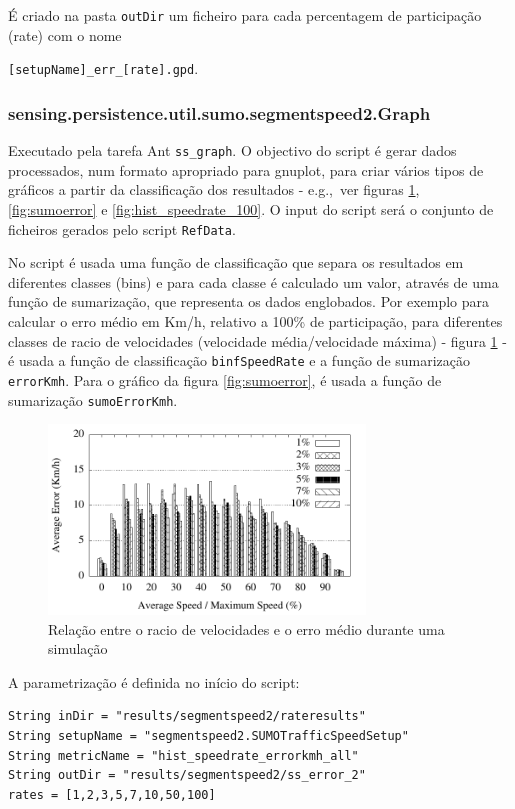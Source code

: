 \documentclass{article}
\newcommand{\eg}{e.g.,\ }
\newcommand{\tm}[1]{\texttt{#1}}
\begin{document}
É criado na pasta \tm{outDir} um ficheiro para cada percentagem de participação (rate) com o nome 

\tm{[setupName]\_err\_[rate].gpd}.

\subsubsection{sensing.persistence.util.sumo.segmentspeed2.Graph}\label{sec:graph}
Executado pela tarefa Ant \tm{ss\_graph}. O objectivo do script é gerar dados processados, num formato apropriado para gnuplot, para criar vários tipos de gráficos a partir da classificação dos resultados - \eg ver figuras \ref{fig:speedrate_errorkmh}, \ref{fig:sumoerror} e \ref{fig:hist_speedrate_100}. O input do script será  o conjunto de ficheiros gerados pelo script \tm{RefData}.

No script é usada uma função de classificação que separa os resultados em diferentes classes (bins) e para cada classe é calculado um valor, através de uma função de sumarização, que representa os dados englobados. Por exemplo para calcular o erro médio em Km/h, relativo a 100\% de participação, para diferentes classes de racio de velocidades (velocidade média/velocidade máxima) - figura \ref{fig:speedrate_errorkmh} - é usada a função de classificação \tm{binfSpeedRate} e a função de sumarização \tm{errorKmh}. Para o gráfico da figura \ref{fig:sumoerror}, é usada a função de sumarização \tm{sumoErrorKmh}.

\begin{figure}[h!]
	\centering
	\includegraphics[width=0.75\textwidth]{figs/ss_speedrate_errorkmh.pdf}
	\caption{Relação entre o racio de velocidades e o erro médio durante uma simulação}
	\label{fig:speedrate_errorkmh}
\end{figure}

A parametrização é definida no início do script:

\begin{Verbatim}
String inDir = "results/segmentspeed2/rateresults"
String setupName = "segmentspeed2.SUMOTrafficSpeedSetup"
String metricName = "hist_speedrate_errorkmh_all"
String outDir = "results/segmentspeed2/ss_error_2"
rates = [1,2,3,5,7,10,50,100]
\end{Verbatim}
\end{document}
